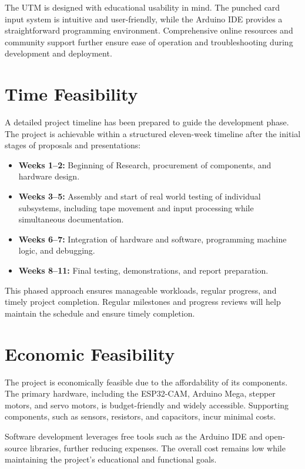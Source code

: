 The UTM is designed with educational usability in mind. The punched card input system is intuitive and user-friendly, while the Arduino IDE provides a straightforward programming environment. Comprehensive online resources and community support further ensure ease of operation and troubleshooting during development and deployment.

\section{Time Feasibility}

A detailed project timeline has been prepared to guide the development phase. The project is achievable within a structured eleven-week timeline after the initial stages of proposals and presentations:

\begin{itemize}
    \item \textbf{Weeks 1--2:} Beginning of Research, procurement of components, and hardware design.
    \item \textbf{Weeks 3--5:} Assembly and start of real world testing of individual subsystems, including tape movement and input processing while simultaneous documentation.
    \item \textbf{Weeks 6--7:} Integration of hardware and software, programming machine logic, and debugging.
    \item \textbf{Weeks 8--11:} Final testing, demonstrations, and report preparation.
\end{itemize}

This phased approach ensures manageable workloads, regular progress, and timely project completion. Regular milestones and progress reviews will help maintain the schedule and ensure timely completion.

\section{Economic Feasibility}

The project is economically feasible due to the affordability of its components. The primary hardware, including the ESP32-CAM, Arduino Mega, stepper motors, and servo motors, is budget-friendly and widely accessible. Supporting components, such as sensors, resistors, and capacitors, incur minimal costs.

Software development leverages free tools such as the Arduino IDE and open-source libraries, further reducing expenses. The overall cost remains low while maintaining the project’s educational and functional goals.

